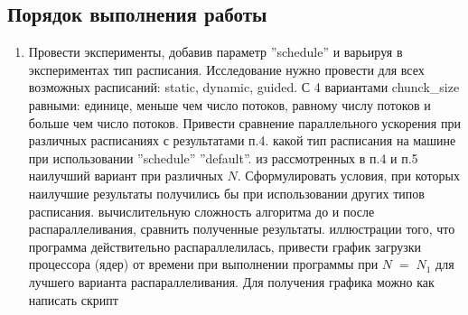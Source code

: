 { %
	\subsection{Порядок выполнения работы}
	\begin{enumerate}
		 во все for-циклы (кроме цикла в функции main, указывающего количество экспериментов) в программе из ЛР №1 следующую директиву OpenMP: \\	
''\#pragma omp parallel for default(none) private(...) shared(...)''. Наличие параметра default(none) является обязательным.
		 все for-циклы на внутренние зависимости по данным между итерациями. Если зависимости обнаружились, использовать для защиты критических секций директиву ''\#pragma omp critical'' или ''\#pragma omp atomic'' (если операция атомарна), или параметр reduction (предпочтительнее) или вообще отказаться от распараллеливания цикла (свой выбор необходимо обосновать).
		, что получившаяся программа обладает свойством прямой совместимости с компиляторами, не поддерживающими \\OpenMP (для проверки этого можно скомпилировать программу без опции ''–fopenmp'', в результате не должно быть сообщений об ошибках, а программа должна корректно работать).
		 функцию SetNumThreads для изменения числа потоков. В отчете указать максимальное количество потоков.
		 эксперименты, замеряя параллельное ускорение. Привести сравнение графиков параллельного ускорения с ЛР №1 и ЛР №2.
		\item Провести эксперименты, добавив параметр ''schedule'' и варьируя в экспериментах тип расписания. Исследование нужно провести для всех возможных расписаний: static, dynamic, guided. С 4 вариантами chunck\_size равными: единице, меньше чем число потоков, равному числу потоков и больше чем число потоков. Привести сравнение параллельного ускорения при различных расписаниях с результатами п.4.
	     какой тип расписания на машине при использовании ''schedule'' ''default''.
		 из рассмотренных в п.4 и п.5 наилучший вариант при различных $N$. Сформулировать условия, при которых наилучшие результаты получились бы при использовании других типов расписания.
		 вычислительную сложность алгоритма до и после распараллеливания, сравнить полученные результаты.
		 иллюстрации того, что программа действительно распараллелилась, привести график загрузки процессора (ядер) от времени при выполнении программы при $N\;=\;N_1$ для лучшего варианта распараллеливания. Для получения графика можно как написать скрипт 

\end{enumerate}}
